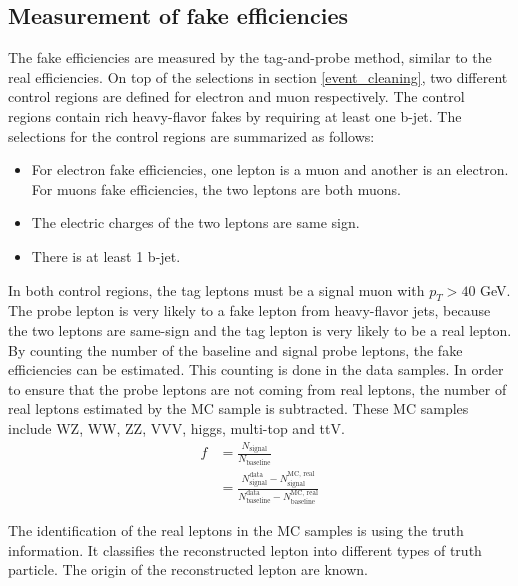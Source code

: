 \subsection{Measurement of fake efficiencies}
\label{sec:fake_eff}
The fake efficiencies are measured by the tag-and-probe method, similar to the real efficiencies.
On top of the selections in section \ref{event_cleaning}, two different control regions are defined for electron and muon respectively.
The control regions contain rich heavy-flavor fakes by requiring at least one b-jet.
The selections for the control regions are summarized as follows:
\begin{itemize}
\item For electron fake efficiencies, one lepton is a muon and another is an electron. For muons fake efficiencies, the two leptons are both muons.
\item The electric charges of the two leptons are same sign.
\item There is at least 1 b-jet.
\end{itemize}

In both control regions, the tag leptons must be a signal muon with $p_T > 40$ GeV.
The probe lepton is very likely to a fake lepton from heavy-flavor jets, because the two leptons are same-sign and the tag lepton is very likely to be a real lepton.
By counting the number of the baseline and signal probe leptons, the fake efficiencies can be estimated.
This counting is done in the data samples.
In order to ensure that the probe leptons are not coming from real leptons, the number of real leptons estimated by the MC sample is subtracted.
These MC samples include WZ, WW, ZZ, VVV, higgs, multi-top and ttV.
\begin{align}
f &= \frac{N_{\text{signal}}}{N_{\text{baseline}}} \\
&= \frac{N^{\text{data}}_{\text{signal}} - N^{\text{MC, real}}_{\text{signal}}}{N^{\text{data}}_{\text{baseline}} - N^{\text{MC, real}}_{\text{baseline}}}
\end{align}

The identification of the real leptons in the MC samples is using the truth information.
It classifies the reconstructed lepton into different types of truth particle.
The origin of the reconstructed lepton are known.

